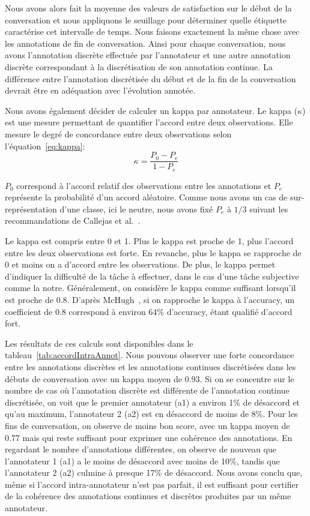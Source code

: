 Nous avons alors fait la moyenne des valeurs de satisfaction sur le début de la conversation et nous appliquons le seuillage pour déterminer quelle étiquette caractérise cet intervalle de temps. Nous faisons exactement la même chose avec les annotations de fin de conversation. Ainsi pour chaque conversation, nous avons l'annotation discrète effectuée par l'annotateur et une autre annotation discrète correspondant à la discrétisation de son annotation continue.
La différence entre l'annotation discrétisée du début et de la fin de la conversation devrait être en adéquation avec l'évolution annotée.

Nous avons également décider de calculer un kappa par annotateur.
Le kappa ($\kappa$) est une mesure permettant de quantifier l'accord entre deux observations. Elle mesure le degré de concordance entre deux observations selon l'équation~\ref{eq:kappa}:
\begin{equation}
    \kappa = \dfrac{P_0 - P_e}{1 - P_e}
    \label{eq:kappa}
\end{equation}

$P_0$ correspond à l'accord relatif des observations entre les annotations et $P_e$ représente la probabilité d'un accord aléatoire. Comme nous avons un cas de sur-représentation d'une classe, ici le neutre, nous avons fixé $P_e$ à $1/3$ suivant les recommandations de Callejas et al.~\cite{Callejas2008}.

Le kappa est compris entre 0 et 1. Plus le kappa est proche de 1, plus l'accord entre les deux observations est forte. En revanche, plus le kappa se rapproche de 0 et moins on a d'accord entre les observations. De plus, le kappa permet d'indiquer la difficulté de la tâche à effectuer, dans le cas d'une tâche subjective comme la notre. Généralement, on considère le kappa comme suffisant lorsqu'il est proche de 0.8. D'après McHugh~\cite{McHugh2012}, si on rapproche le kappa à l'accuracy, un coefficient de 0.8 correspond à environ 64\% d'accuracy, étant qualifié d'accord fort.


Les résultats de ces calculs sont disponibles dans le tableau~\ref{tab:accordIntraAnnot}. Nous pouvons observer une forte concordance entre les annotations discrètes et les annotations continues discrétisées dans les débuts de conversation avec un kappa moyen de 0.93. Si on se concentre sur le nombre de cas où l'annotation discrète est différente de l'annotation continue discrétisée, on voit que le premier annotateur (a1) a environ 1\% de désaccord et qu'au maximum, l'annotateur 2 (a2) est en désaccord de moins de 8\%.
Pour les fins de conversation, on observe de moins bon score, avec un kappa moyen de 0.77 mais qui reste suffisant pour exprimer une cohérence des annotations. En regardant le nombre d'annotations différentes, on observe de nouveau que l'annotateur 1 (a1) a le moins de désaccord avec moins de 10\%, tandis que l'annotateur 2 (a2) culmine à presque 17\% de désaccord.
Nous avons conclu que, même si l'accord intra-annotateur n'est pas parfait, il est suffisant pour certifier de la cohérence des annotations continues et discrètes produites par un même annotateur.

